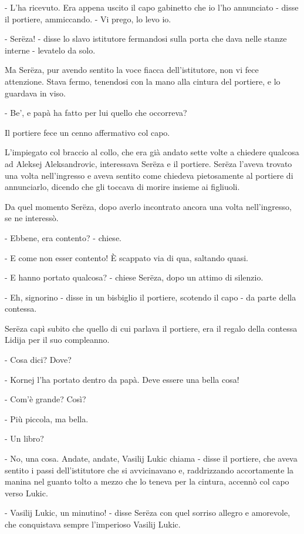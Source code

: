 - L'ha ricevuto. Era appena uscito il capo gabinetto che io l'ho annunciato - disse il portiere, ammiccando. - Vi prego, lo levo io. 

- Serëza! - disse lo slavo istitutore fermandosi sulla porta che dava nelle stanze interne - levatelo da solo. 

Ma Serëza, pur avendo sentito la voce fiacca dell'istitutore, non vi fece attenzione. Stava fermo, tenendosi con la mano alla cintura del portiere, e lo guardava in viso. 

- Be', e papà ha fatto per lui quello che occorreva? 

Il portiere fece un cenno affermativo col capo. 

L'impiegato col braccio al collo, che era già andato sette volte a chiedere qualcosa ad Aleksej Aleksandrovic, interessava Serëza e il portiere. Serëza l'aveva trovato una volta nell'ingresso e aveva sentito come chiedeva pietosamente al portiere di annunciarlo, dicendo che gli toccava di morire insieme ai figliuoli. 

Da quel momento Serëza, dopo averlo incontrato ancora una volta nell'ingresso, se ne interessò. 

- Ebbene, era contento? - chiese. 

- E come non esser contento! È scappato via di qua, saltando quasi. 

- E hanno portato qualcosa? - chiese Serëza, dopo un attimo di silenzio. 

- Eh, signorino - disse in un bisbiglio il portiere, scotendo il capo - da parte della contessa. 

Serëza capì subito che quello di cui parlava il portiere, era il regalo della contessa Lidija per il suo compleanno. 

- Cosa dici? Dove? 

- Kornej l'ha portato dentro da papà. Deve essere una bella cosa! 

- Com'è grande? Così? 

- Più piccola, ma bella. 

- Un libro? 

- No, una cosa. Andate, andate, Vasilij Lukic chiama - disse il portiere, che aveva sentito i passi dell'istitutore che si avvicinavano e, raddrizzando accortamente la manina nel guanto tolto a mezzo che lo teneva per la cintura, accennò col capo verso Lukic. 

- Vasilij Lukic, un minutino! - disse Serëza con quel sorriso allegro e amorevole, che conquistava sempre l'imperioso Vasilij Lukic. 

